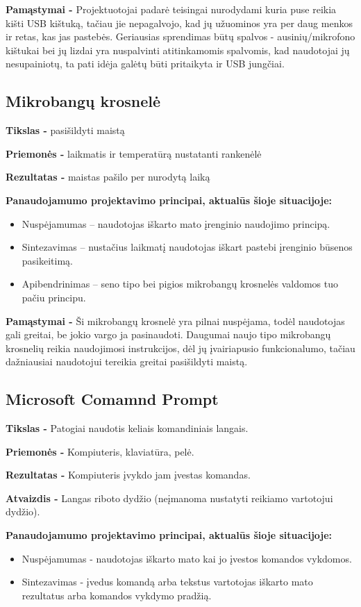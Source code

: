﻿\documentclass[a4paper, 12pt]{article}
\begin{document}
		\textbf{Pamąstymai -}
		Projektuotojai padarė teisingai nurodydami kuria puse reikia kišti USB kištuką, tačiau jie nepagalvojo, kad jų užuominos yra per daug menkos ir retas, kas jas pastebės. 
		Geriausias sprendimas būtų spalvos - ausinių/mikrofono kištukai bei jų lizdai yra nuspalvinti atitinkamomis spalvomis, kad naudotojai jų nesupainiotų, ta pati idėja galėtų būti pritaikyta ir USB jungčiai.

	\subsection{Mikrobangų krosnelė}
		\textbf{Tikslas -}
		pasišildyti maistą

		\textbf{Priemonės -} 
		laikmatis ir temperatūrą nustatanti rankenėlė

		\textbf{Rezultatas -}
		maistas pašilo per nurodytą laiką

		\textbf{Panaudojamumo projektavimo principai, aktualūs šioje situacijoje:}
		\begin{itemize}
		\item Nuspėjamumas – naudotojas iškarto mato įrenginio naudojimo principą.	
		\item Sintezavimas – nustačius laikmatį naudotojas iškart pastebi įrenginio būsenos pasikeitimą.
		\item Apibendrinimas – seno tipo bei pigios mikrobangų krosnelės valdomos tuo pačiu principu.
		\end{itemize}

		\textbf{Pamąstymai -}
		Ši mikrobangų krosnelė yra pilnai nuspėjama, todėl naudotojas gali greitai, be jokio vargo ja pasinaudoti. 
		Daugumai naujo tipo mikrobangų krosnelių reikia naudojimosi instrukcijos, dėl jų įvairiapusio funkcionalumo, tačiau dažniausiai naudotojui tereikia greitai pasišildyti maistą.	

	\subsection{Microsoft Comamnd Prompt}
		\textbf{Tikslas -}
		Patogiai naudotis keliais komandiniais langais.
		
		\textbf{Priemonės -}
		Kompiuteris, klaviatūra, pelė.
		
		\textbf{Rezultatas -}
		Kompiuteris įvykdo jam įvestas komandas.	
		
		\textbf{Atvaizdis -}
		Langas riboto dydžio (neįmanoma nustatyti reikiamo vartotojui dydžio).

		\textbf{Panaudojamumo projektavimo principai, aktualūs šioje situacijoje:}
		\begin{itemize}
		\item Nuspėjamumas - naudotojas iškarto mato kai jo įvestos komandos vykdomos.
		\item Sintezavimas - įvedus komandą arba tekstus vartotojas iškarto mato rezultatus arba komandos vykdymo pradžią.
		\end{itemize}
\end{document}

